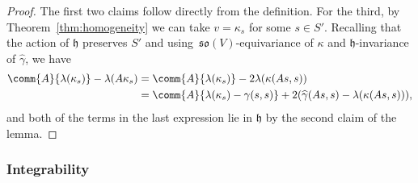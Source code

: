 \documentclass[10pt,a4paper]{amsart}
\numberwithin{equation}{section}
\newcommand{\fh}{\mathfrak{h}}
\newcommand{\fso}{\mathfrak{so}}
\newcommand{\gammahat}{\widehat{\gamma}}
\newcommand{\1}{\mathbbm{1}}
\begin{document}
\begin{proof}
	The first two claims follow directly from the definition. For the third, by Theorem~\ref{thm:homogeneity} we can take $v=\kappa_s$ for some $s\in S'$. Recalling that the action of $\fh$ preserves $S'$ and using~$\fso(V)$-equivariance of $\kappa$ and $\fh$-invariance of $\gammahat$, we have
	\begin{align*}
		\comm{A}{\lambda(\kappa_s)} - \lambda(A\kappa_s)
		 &= \comm{A}{\lambda(\kappa_s)} - 2\lambda(\kappa(As,s))\\
		 &= \comm{A}{\lambda(\kappa_s)-\gamma(s,s)} + 2(\gammahat(As,s)-\lambda(\kappa(As,s))),
	\end{align*}
	and both of the terms in the last expression lie in $\fh$ by the second claim of the lemma.
\end{proof}

\subsubsection{Integrability}
\label{sec:integrability}
\end{document}
